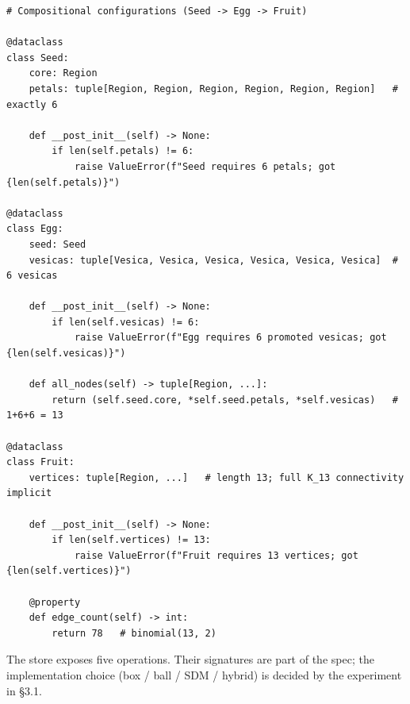 \documentclass[11pt,a4paper]{article}
\begin{document}
\begin{lstlisting}
# Compositional configurations (Seed -> Egg -> Fruit)

@dataclass
class Seed:
    core: Region
    petals: tuple[Region, Region, Region, Region, Region, Region]   # exactly 6

    def __post_init__(self) -> None:
        if len(self.petals) != 6:
            raise ValueError(f"Seed requires 6 petals; got {len(self.petals)}")

@dataclass
class Egg:
    seed: Seed
    vesicas: tuple[Vesica, Vesica, Vesica, Vesica, Vesica, Vesica]  # 6 vesicas

    def __post_init__(self) -> None:
        if len(self.vesicas) != 6:
            raise ValueError(f"Egg requires 6 promoted vesicas; got {len(self.vesicas)}")

    def all_nodes(self) -> tuple[Region, ...]:
        return (self.seed.core, *self.seed.petals, *self.vesicas)   # 1+6+6 = 13

@dataclass
class Fruit:
    vertices: tuple[Region, ...]   # length 13; full K_13 connectivity implicit

    def __post_init__(self) -> None:
        if len(self.vertices) != 13:
            raise ValueError(f"Fruit requires 13 vertices; got {len(self.vertices)}")

    @property
    def edge_count(self) -> int:
        return 78   # binomial(13, 2)
\end{lstlisting}

The store exposes five operations. Their signatures are part of the spec; the implementation choice (box / ball / SDM / hybrid) is decided by the experiment in \S 3.1.
\end{document}
